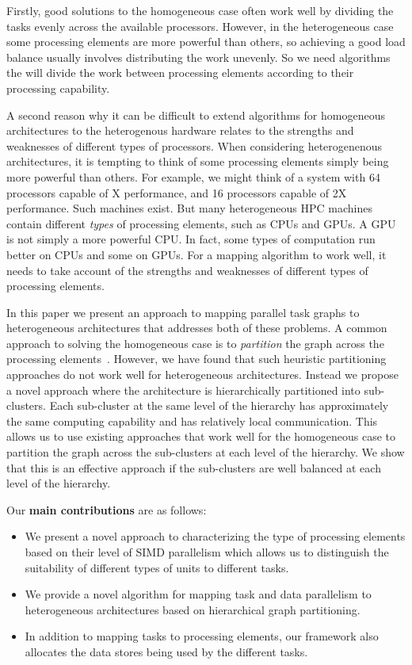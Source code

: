 Firstly, good solutions to the homogeneous case often work well
by dividing the tasks evenly across the available processors. However,
in the heterogeneous case some processing elements are more powerful
than others, so achieving a good load balance usually involves
distributing the work unevenly. So we need algorithms the will divide
the work between processing elements according to their processing
capability.

A second reason why it can be difficult to extend algorithms for
homogeneous architectures to the heterogenous hardware relates to the
strengths and weaknesses of different types of processors. When
considering heterogenenous architectures, it is tempting to think of
some processing elements simply being more powerful than others. For
example, we might think of a system with 64 processors capable of X
performance, and 16 processors capable of 2X performance. Such machines
exist. But many heterogeneous HPC machines contain different
\textit{types} of processing elements, such as CPUs and GPUs. A GPU is
not simply a more powerful CPU. In fact, some types of computation run
better on CPUs and some on GPUs.  For a mapping algorithm to work well,
it needs to take account of the strengths and weaknesses of different
types of processing elements.

In this paper we present an approach to mapping parallel task graphs to
heterogeneous architectures that addresses both of these problems.  A
common approach to solving the homogeneous case is to \textit{partition}
the graph across the processing elements~\cite{aale01,kpur99,enys98}.
However, we have found that such heuristic partitioning approaches do
not work well for heterogeneous architectures. Instead we propose a
novel approach where the architecture is hierarchically partitioned into
sub-clusters.  Each sub-cluster at the same level of the hierarchy has
approximately the same computing capability and has relatively local
communication.  This allows us to use existing approaches that work well
for the homogeneous case to partition the graph across the sub-clusters
at each level of the hierarchy. We show that this is an effective
approach if the sub-clusters are well balanced at each level of the
hierarchy.

Our \textbf{main contributions} are as follows:
\begin{itemize}
\item We present a novel approach to characterizing the type of
  processing elements based on their level of SIMD parallelism which
  allows us to distinguish the suitability of different types of units
  to different tasks.
\item We provide a novel algorithm for mapping task and data parallelism
  to heterogeneous architectures based on hierarchical graph
  partitioning.
\item In addition to mapping tasks to processing elements, our framework
  also allocates the data stores being used by the different tasks.
\end{itemize}

